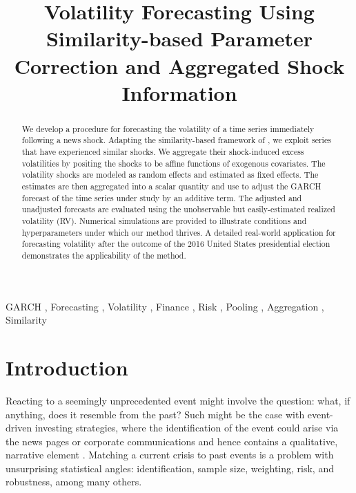 \documentclass[11pt,3p,review,authoryear]{elsarticle}
\theoremstyle{definition}
\begin{document}
\begin{frontmatter}

\title{Volatility Forecasting Using Similarity-based Parameter Correction and Aggregated Shock Information}

\begin{abstract}
  We develop a procedure for forecasting the volatility of a time series immediately following a news shock.  Adapting the similarity-based framework of \citet{lin2021minimizing}, we exploit series that have experienced similar shocks.  We aggregate their shock-induced excess volatilities by positing the shocks to be affine functions of exogenous covariates.  The volatility shocks are modeled as random effects and estimated as fixed effects.  The estimates are then aggregated into a scalar quantity and use to adjust the GARCH forecast of the time series under study by an additive term.  The adjusted and unadjusted forecasts are evaluated using the unobservable but easily-estimated realized volatility (RV). Numerical simulations are provided to illustrate conditions and hyperparameters under which our method thrives. A detailed real-world application for forecasting volatility after the outcome of the 2016 United States presidential election demonstrates the applicability of the method.
\end{abstract}

\begin{keyword}
  GARCH \sep 
 Forecasting \sep 
 Volatility \sep 
Finance \sep
Risk \sep
Pooling \sep
Aggregation \sep
Similarity
\end{keyword}

\end{frontmatter}

\section{Introduction}

Reacting to a seemingly unprecedented event might involve the question: what, if anything, does it resemble from the past?  Such might be the case with event-driven investing strategies, where the identification of the event could arise via the news pages or corporate communications and hence contains a qualitative, narrative element \citep{Kenton}.  Matching a current crisis to past events is a problem with unsurprising statistical angles: identification, sample size, weighting, risk, and robustness, among many others.  
\end{document}
